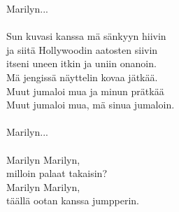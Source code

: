         Marilyn... \\
\hspace{10mm} \\
        Sun kuvasi kanssa mä sänkyyn hiivin \\
        ja siitä Hollywoodin aatosten siivin \\
        itseni uneen itkin ja uniin onanoin. \\
        Mä jengissä näyttelin kovaa jätkää. \\
        Muut jumaloi mua ja minun prätkää \\
        Muut jumaloi mua, mä sinua jumaloin. \\
\hspace{10mm} \\
        Marilyn... \\
\hspace{10mm} \\
        Marilyn Marilyn, \\
        milloin palaat takaisin? \\
        Marilyn Marilyn, \\
        täällä ootan kanssa jumpperin. \\
